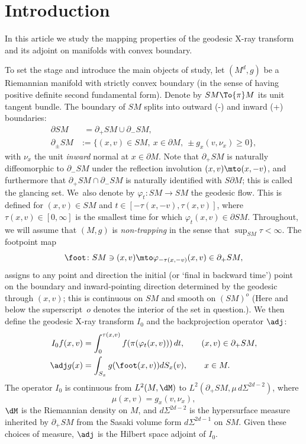 \section{Introduction}\label{sec:intro}
In this article we study the mapping properties of the geodesic X-ray transform and its adjoint on manifolds with convex boundary.

To set the stage and introduce the main objects of study, let $(M^d,g)$ be a Riemannian manifold with strictly convex boundary (in the sense of
having positive definite second fundamental form). Denote by $SM\To{\pi} M$ its unit tangent bundle. The boundary of
$SM$ splits into outward (-) and inward (+) boundaries:
\begin{equation}
\begin{aligned}
\partial SM &\phantom{:}= \partial_+ SM \cup \partial_- SM, \\
\partial_\pm SM &:= \{ (x,v)\in SM,\ x\in \partial M,\ \pm g_x(v,\nu_x)\ge 0 \},
\label{eq:dSM}
\end{aligned}
\end{equation}
with $\nu_x$ the unit {\it inward} normal at $x\in \partial M$. Note that $\partial_+ SM$ is naturally diffeomorphic to
$\partial_- SM$ under the reflection involution $(x,v)\mto (x,-v)$, and furthermore that $\partial_+ SM \cap \partial_-SM$ is naturally identified
with $S\partial M$; this is called the glancing set. We~also denote by $\varphi_t \colon SM\to SM$ the geodesic flow. This is
defined for $(x,v)\in SM$ and $t\in [-\tau(x,-v),\tau(x,v)]$, where $\tau(x,v) \in [0,\infty]$ is the smallest time for which
$\varphi_t(x,v) \in \partial SM$. Throughout, we will assume that $(M,g)$ is {\em non-trapping} in the sense that
$\sup_{SM} \tau <\infty$. The footpoint map
\begin{equation*}%
\foot\colon SM\ni (x,v) \mto \varphi_{-\tau(x,-v)} (x,v) \in \partial_+ SM,
\end{equation*}
assigns to any point and direction the initial (or `final in backward time') point on the boundary and inward-pointing direction determined by the geodesic through $(x,v)$;
this is continuous on $SM$ and smooth on $(SM)^{o}$ (Here and below the superscript~$o$ deno\-tes the interior of the set in question.). We then define the geodesic X-ray transform $I_0$ and the backprojection operator $\adj$:
\begin{align}
I_0 f (x,v) &= \int_0^{\tau(x,v)} f(\pi (\varphi_t(x,v)))\,dt, \qquad (x,v) \in \partial_+ SM, \label{eq:forward} \\
\adj g (x) &= \int_{S_x} g(\foot (x,v)) dS_x(v), \qquad x \in M. \label{eq:adjoint}
\end{align}
The operator $I_0$ is continuous from $L^2(M, \dM)$ to $L^2(\partial_+ SM, \mu\, d\Sigma^{2d-2})$, where
\[
\mu(x,v) = g_x(v,\nu_x),
\]
$\dM$ is the Riemannian density on $M$, and $d\Sigma^{2d-2}$ is the hypersurface measure inher\-ited by $\partial_+ SM$ from the Sasaki volume form $d\Sigma^{2d-1}$ on $SM$. Given these choices of measure, $\adj $ is the Hilbert space adjoint of $I_0$.

